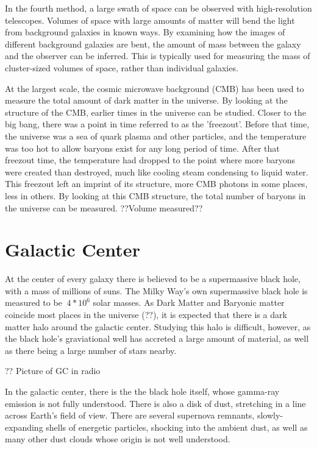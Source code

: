 In the fourth method, a large swath of space can be observed with high-resolution telescopes.
Volumes of space with large amounts of matter will bend the light from background galaxies in known ways.
By examining how the images of different background galaxies are bent, the amount of mass between the galaxy and the observer can be inferred.
This is typically used for measuring the mass of cluster-sized volumes of space, rather than individual galaxies.

At the largest scale, the cosmic microwave background (CMB) has been used to measure the total amount of dark matter in the universe.
By looking at the structure of the CMB, earlier times in the universe can be studied.
Closer to the big bang, there was a point in time referred to as the 'freezout'.
Before that time, the universe was a sea of quark plasma and other particles, and the temperature was too hot to allow baryons exist for any long period of time.
After that freezout time, the temperature had dropped to the point where more baryons were created than destroyed, much like cooling steam condensing to liquid water.
This freezout left an imprint of its structure, more CMB photons in some places, less in others.
By looking at this CMB structure, the total number of baryons in the universe can be measured.
??Volume measured??


\section{Galactic Center}

At the center of every galaxy there is believed to be a supermassive black hole, with a mass of millions of suns.
The Milky Way's own supermassive black hole is measured to be $~4*10^6$ solar masses.
As Dark Matter and Baryonic matter coincide most places in the universe (??), it is expected that there is a dark matter halo around the galactic center.
Studying this halo is difficult, however, as the black hole's graviational well has accreted a large amount of material, as well as there being a large number of stars nearby.

?? Picture of GC in radio

In the galactic center, there is the the black hole itself, whose gamma-ray emission is not fully understood.
There is also a disk of dust, stretching in a line across Earth's field of view.
There are several supernova remnants, slowly-expanding shells of energetic particles, shocking into the ambient dust, as well as many other dust clouds whose origin is not well understood.


